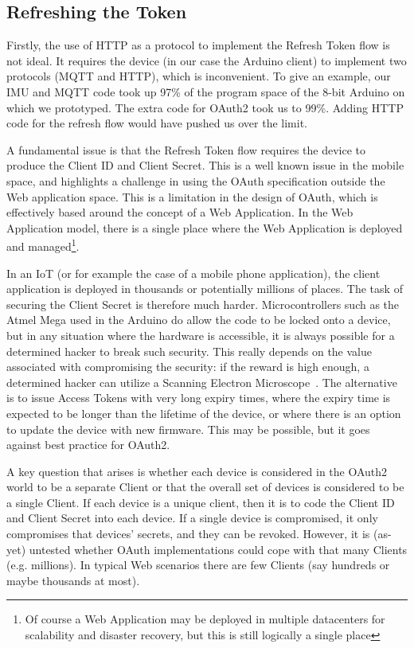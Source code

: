 \documentclass{llncs}
\begin{document}
\subsection{Refreshing the Token}
Firstly, the use of HTTP as a protocol to implement the Refresh Token flow is not ideal. 
It requires the device (in our case the Arduino client) to implement two protocols (MQTT and HTTP), which is 
inconvenient. To give an example, our IMU and MQTT code took up 97\% of the program space of the 8-bit 
Arduino on which we prototyped. The extra code for OAuth2 took us to 99\%.
Adding HTTP code for the refresh flow would have pushed us over the limit.

A fundamental issue is that the Refresh Token flow requires the device to 
produce the Client ID and Client Secret. This is a well known issue in the mobile space, and 
highlights a challenge in using the OAuth specification outside the Web application space.
This is a limitation in the design of OAuth, which is effectively based around the concept 
of a Web Application. In the Web Application model, there is a single place where the Web Application
is deployed and managed\footnote{Of course a Web Application may be deployed in multiple datacenters
for scalability and disaster recovery, but this is still logically a single place}.

In an IoT (or for example the case of a mobile phone application), the client application is deployed in 
thousands or potentially millions of places. The task of securing the Client Secret is therefore 
much harder. Microcontrollers such as the Atmel Mega used in the Arduino do
allow the code to be locked onto a device, but in any situation where the hardware is 
accessible, it is always possible for a determined hacker to break such security. This really 
depends on the value associated with compromising the security: if the reward is high enough, 
a determined hacker can utilize a Scanning Electron Microscope~\cite{silicon-investigations}.
The alternative is to issue Access Tokens with very long expiry times, where the expiry time 
is expected to be longer than the lifetime of the device, or where there is an option to update
the device with new firmware. This may be possible, but it goes against best practice for OAuth2.

A key question that arises is whether each device is considered in the OAuth2 world to be a separate Client or 
that the overall set of devices is considered to be a single Client. If each device is a unique client, then it is  to 
code the Client ID and Client Secret into each device. If a single device is compromised, it only 
compromises that devices' secrets, and they can be revoked. However, it is (as-yet) untested whether OAuth implementations
could cope with that many Clients (e.g. millions). In typical Web scenarios there are few Clients (say hundreds or maybe thousands at most).
\end{document}
